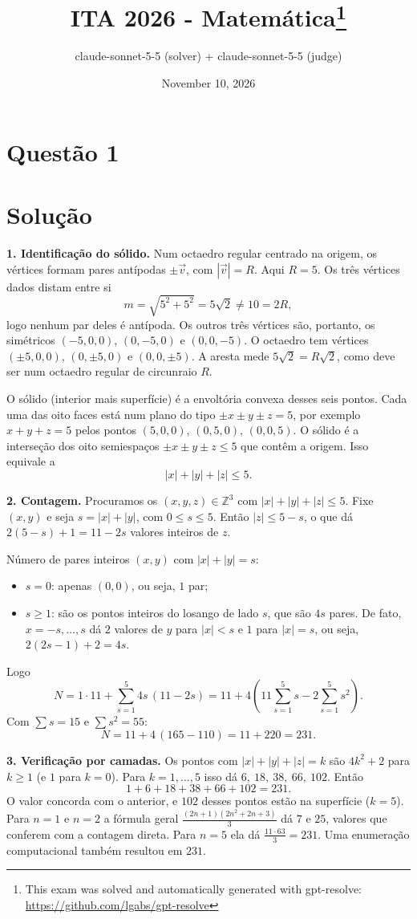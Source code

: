 \documentclass{article}%
\title{ITA 2026 - Matemática\thanks{This exam was solved and automatically generated with gpt-resolve: \url{https://github.com/lgabs/gpt-resolve}}}%
\author{claude{-}sonnet{-}5{-}5 (solver) + claude{-}sonnet{-}5{-}5 (judge)}%
\date{November 10, 2026}%
\begin{document}
%
\normalsize%
\maketitle%
\section*{Questão 1}

\section*{Solução}

\textbf{1. Identificação do sólido.} Num octaedro regular centrado na origem, os vértices formam pares antípodas $\pm\vec v$, com $|\vec v|=R$. Aqui $R=5$. Os três vértices dados distam entre si
$$m=\sqrt{5^2+5^2}=5\sqrt2\neq 10=2R,$$
logo nenhum par deles é antípoda. Os outros três vértices são, portanto, os simétricos $(-5,0,0)$, $(0,-5,0)$ e $(0,0,-5)$. O octaedro tem vértices $(\pm5,0,0)$, $(0,\pm5,0)$ e $(0,0,\pm5)$. A aresta mede $5\sqrt2=R\sqrt2$, como deve ser num octaedro regular de circunraio $R$.

O sólido (interior mais superfície) é a envoltória convexa desses seis pontos. Cada uma das oito faces está num plano do tipo $\pm x\pm y\pm z=5$, por exemplo $x+y+z=5$ pelos pontos $(5,0,0)$, $(0,5,0)$, $(0,0,5)$. O sólido é a interseção dos oito semiespaços $\pm x\pm y\pm z\le 5$ que contêm a origem. Isso equivale a
$$|x|+|y|+|z|\le 5 .$$

\textbf{2. Contagem.} Procuramos os $(x,y,z)\in\mathbb Z^3$ com $|x|+|y|+|z|\le5$. Fixe $(x,y)$ e seja $s=|x|+|y|$, com $0\le s\le5$. Então $|z|\le 5-s$, o que dá $2(5-s)+1=11-2s$ valores inteiros de $z$.

Número de pares inteiros $(x,y)$ com $|x|+|y|=s$:
\begin{itemize}
\item $s=0$: apenas $(0,0)$, ou seja, $1$ par;
\item $s\ge1$: são os pontos inteiros do losango de lado $s$, que são $4s$ pares. De fato, $x=-s,\dots,s$ dá $2$ valores de $y$ para $|x|<s$ e $1$ para $|x|=s$, ou seja, $2(2s-1)+2=4s$.
\end{itemize}

Logo
$$N=1\cdot 11+\sum_{s=1}^{5}4s\,(11-2s)=11+4\left(11\sum_{s=1}^{5}s-2\sum_{s=1}^{5}s^2\right).$$
Com $\sum s=15$ e $\sum s^2=55$:
$$N=11+4\,(165-110)=11+220=231 .$$

\textbf{3. Verificação por camadas.} Os pontos com $|x|+|y|+|z|=k$ são $4k^2+2$ para $k\ge1$ (e $1$ para $k=0$). Para $k=1,\dots,5$ isso dá $6,\ 18,\ 38,\ 66,\ 102$. Então
$$1+6+18+38+66+102=231 .$$
O valor concorda com o anterior, e $102$ desses pontos estão na superfície ($k=5$). Para $n=1$ e $n=2$ a fórmula geral $\frac{(2n+1)(2n^2+2n+3)}{3}$ dá $7$ e $25$, valores que conferem com a contagem direta. Para $n=5$ ela dá $\frac{11\cdot 63}{3}=231$. Uma enumeração computacional também resultou em $231$.
\end{document}
